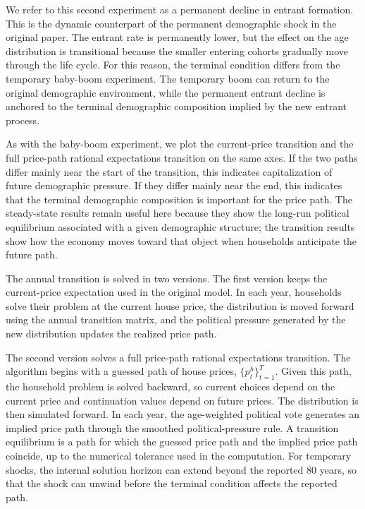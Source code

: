 
{\color{blue}
We refer to this second experiment as a permanent decline in entrant formation. This is the dynamic counterpart of the permanent demographic shock in the original paper. The entrant rate is permanently lower, but the effect on the age distribution is transitional because the smaller entering cohorts gradually move through the life cycle. For this reason, the terminal condition differs from the temporary baby-boom experiment. The temporary boom can return to the original demographic environment, while the permanent entrant decline is anchored to the terminal demographic composition implied by the new entrant process.

As with the baby-boom experiment, we plot the current-price transition and the full price-path rational expectations transition on the same axes. If the two paths differ mainly near the start of the transition, this indicates capitalization of future demographic pressure. If they differ mainly near the end, this indicates that the terminal demographic composition is important for the price path. The steady-state results remain useful here because they show the long-run political equilibrium associated with a given demographic structure; the transition results show how the economy moves toward that object when households anticipate the future path.
}


{\color{blue}
The annual transition is solved in two versions. The first version keeps the current-price expectation used in the original model. In each year, households solve their problem at the current house price, the distribution is moved forward using the annual transition matrix, and the political pressure generated by the new distribution updates the realized price path.

The second version solves a full price-path rational expectations transition. The algorithm begins with a guessed path of house prices, $\{p^h_t\}_{t=1}^T$. Given this path, the household problem is solved backward, so current choices depend on the current price and continuation values depend on future prices. The distribution is then simulated forward. In each year, the age-weighted political vote generates an implied price path through the smoothed political-pressure rule. A transition equilibrium is a path for which the guessed price path and the implied price path coincide, up to the numerical tolerance used in the computation. For temporary shocks, the internal solution horizon can extend beyond the reported 80 years, so that the shock can unwind before the terminal condition affects the reported path.
}


